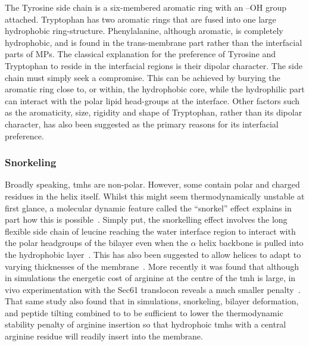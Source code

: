 The Tyrosine side chain is a six-membered aromatic ring with an –OH group attached.
Tryptophan has two aromatic rings that are fused into one large hydrophobic ring-structure.
Phenylalanine, although aromatic, is completely hydrophobic, and is found in the trans-membrane part rather than the interfacial parts of MPs.
The classical explanation for the preference of Tyrosine and Tryptophan to reside in the interfacial regions is their dipolar character.
The side chain must simply seek a compromise.
This can be achieved by burying the aromatic ring close to, or within, the hydrophobic core, while the hydrophilic part can interact with the polar lipid head-groups at the interface.
Other factors such as the aromaticity, size, rigidity and shape of Tryptophan, rather than its dipolar character, has also been suggested as the primary reasons for its interfacial preference.

\subsubsection{Snorkeling}

Broadly speaking, \gls{tmh}s are non-polar.
However, some contain polar and charged residues in the helix itself.
Whilst this might seem thermodynamically unstable at first glance, a molecular dynamic feature called the ``snorkel'' effect explains in part how this is possible~\cite{Chamberlain2004, Strandberg2003}.
Simply put, the snorkelling effect involves the long flexible side chain of leucine reaching the water interface region to interact with the polar headgroups of the bilayer even when the $\alpha$ helix backbone is pulled into the hydrophobic layer~\cite{Krishnakumar2007}.
This has also been suggested to allow helices to adapt to varying thicknesses of the membrane~\cite{Kandasamy2006}.
More recently it was found that although in simulations the energetic cost of arginine at the centre of the \gls{tmh} is large, in vivo experimentation with the Sec61 translocon reveals a much smaller penalty~\cite{Ulmschneider2017}.
That same study also found that in simulations, snorkeling, bilayer deformation, and peptide tilting combined to to be sufficient to lower the thermodynamic stability penalty of arginine insertion so that hydrophoic \gls{tmh}s with a central arginine residue will readily insert into the membrane.


